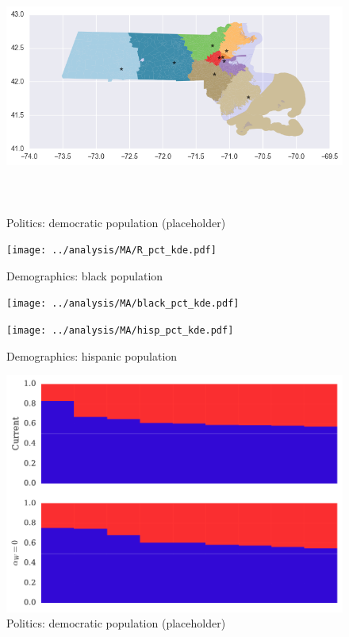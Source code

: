 \begin{figure}[htb!]
\includegraphics[width=5in,height=3in,keepaspectratio]{../maps/MA/static/0_25_after.png}
\end{figure}

\clearpage
\newpage

\begin{figure}[htb!] \centering
\caption{ Politics: democratic population (placeholder)}
\texttt{[image: ../analysis/MA/R\_pct\_kde.pdf]}
\caption{ Demographics: black population }
\texttt{[image: ../analysis/MA/black\_pct\_kde.pdf]}
\caption{ Demographics: hispanic population }
\texttt{[image: ../analysis/MA/hisp\_pct\_kde.pdf]}
\end{figure}

\clearpage
\newpage

\begin{figure}[htb!] \centering
\caption{ Politics: democratic population (placeholder)}
\includegraphics[width=6in]{../analysis/MA/barplot.pdf}
\end{figure}


